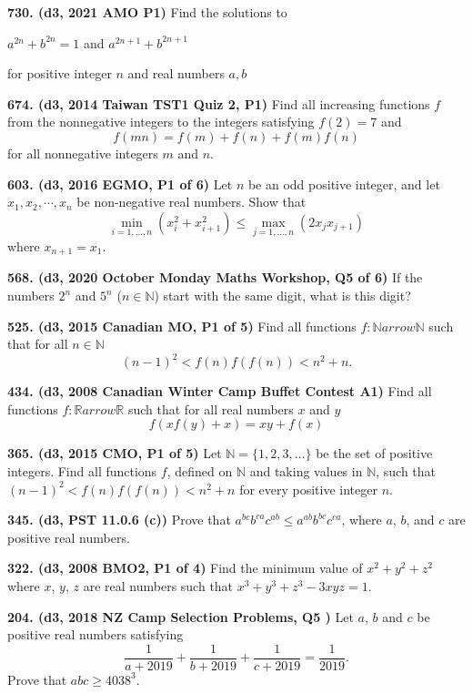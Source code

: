 \documentclass{article}
\begin{document}
\textbf{730. (\color{red}d3\color{black}, 2021 AMO P1)}
Find the solutions to
\begin{center}
    $\displaystyle a^{2n} + b^{2n} = 1 $ and $\displaystyle a^{2n+1} + b^{2n+1}$
\end{center}
for positive integer $n$ and real numbers $a,b$

\textbf{674. (\color{red}d3\color{black}, 2014 Taiwan TST1 Quiz 2, P1)} Find all increasing functions $f$ from the nonnegative integers to the integers satisfying $f(2)=7$ and\[ f(mn) = f(m) + f(n) + f(m)f(n) \]for all nonnegative integers $m$ and $n$.

\textbf{603. (\color{red}d3\color{black}, 2016 EGMO, P1 of 6)} Let $n$ be an odd positive integer, and let $x_1,x_2,\cdots ,x_n$ be non-negative real numbers. Show that\[ \min_{i=1,\ldots,n} (x_i^2+x_{i+1}^2) \leq \max_{j=1,\ldots,n} (2x_jx_{j+1}) \]where $x_{n+1}=x_1$.

\textbf{568. (\color{red}d3\color{black}, 2020 October Monday Maths Workshop, Q5 of 6)} If the numbers $2^n$ and $5^n$ ($n \in \mathbb{N}$) start with the same digit, what is this digit?

\textbf{525. (\color{red}d3\color{black}, 2015 Canadian MO, P1 of 5)} Find all functions $f: \mathbb{N} arrow \mathbb{N}$ such that for all $n \in \mathbb{N}$
$$
    (n-1)^{2}<f(n) f(f(n))<n^{2}+n.
$$

\textbf{434. (\color{red}d3\color{black}, 2008 Canadian Winter Camp Buffet Contest A1)} Find all functions \(f: \mathbb{R} arrow \mathbb{R}\) such that for all real numbers \(x\) and \(y\)
\[
    f(x f(y)+x)=xy + f(x)
\]

\textbf{365. (\color{red}d3\color{black}, 2015 CMO, P1 of 5)} Let $\mathbb{N} = \{1,2,3,\dots\}$ be the set of positive integers. Find all functions $f$, defined on $\mathbb{N}$ and taking values in $\mathbb{N}$, such that $(n-1)^2 < f(n)f(f(n)) < n^2 + n$ for every positive integer $n$.

\textbf{345. (\color{red}d3\color{black}, PST 11.0.6 (c))} Prove that \(a^{bc}b^{ca}c^{ab} \leq a^{ab}b^{bc}c^{ca}\), where \(a\), \(b\), and \(c\) are positive real numbers.

\textbf{322. (\color{red}d3\color{black}, 2008 BMO2, P1 of 4)} Find the minimum value of $x^2 + y^2 + z^2$ where $x$, $y$, $z$ are real numbers such that $x^3 + y^3 + z^3 - 3xyz = 1$.

\textbf{204. (\color{red}d3\color{black}, 2018 NZ Camp Selection Problems, Q5 )} Let $a$, $b$ and $c$ be positive real numbers satisfying \[\frac{1}{a+2019} + \frac1{b+2019} + \frac1{c+2019} = \frac1{2019}.\] Prove that $abc \geq 4038^3$.
\end{document}
